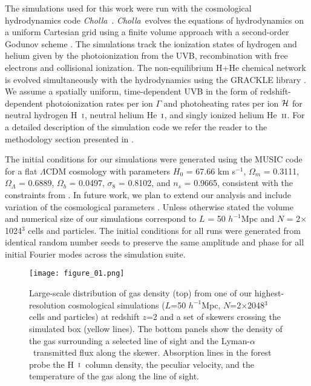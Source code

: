 \documentclass[twocolumn]{aastex62}
\newcommand\Cholla{\emph{Cholla}~}
\newcommand\Lya{Lyman-$\alpha$}
\def\HI{\hbox{\rm H~$\scriptstyle\rm I$}}
\def\HeI{\hbox{He~$\scriptstyle\rm I$}}
\def\HeII{\hbox{He~$\scriptstyle\rm II$}}
\begin{document}
The simulations used for this work were run with the 
cosmological hydrodynamics code \Cholla \citep{schneider2015a, villasenor2021a}. 
\Cholla evolves the equations of hydrodynamics on a uniform Cartesian grid using a finite volume approach with 
a second-order Godunov scheme \citep{Colella+1984}. The simulations track the ionization states of hydrogen and helium 
given by the photoionization 
from the UVB, recombination with free electrons and collisional ionization. The non-equilibrium  H+He chemical network is evolved
simultaneously with the hydrodynamics using the GRACKLE library \citep{smith2017a}. We assume a spatially uniform, time-dependent UVB  
in the form of redshift-dependent photoionization rates per ion $\Gamma$ and photoheating rates per ion $\cal{H}$ for neutral hydrogen \HI, neutral 
helium \HeI,  and singly ionized helium \HeII. For a detailed description of the simulation code we refer the reader to the methodology 
section presented in \cite{villasenor2021a}.   

The initial conditions for our simulations were generated using the MUSIC code \citep{Hahn+2011_Music} for a flat $\Lambda$CDM cosmology with parameters $H_0$ = 67.66 km s$^{-1}$, $\Omega_m$ = 0.3111, $\Omega_{\Lambda}$ = 0.6889, $\Omega_b$ = 0.0497, $\sigma_8$ = 0.8102, 
and $n_s$ = 0.9665, consistent with the constraints from \cite{Planck_collaboration_2020}. In future work, we plan to extend our analysis
and include variation of the cosmological parameters \citep{Bird+2019, Ho+2021}.   
Unless otherwise stated the volume and numerical size of 
our simulations correspond to $L$ = 50 $h^{-1}$Mpc and $N$ = 2$\times$1024$^3$ cells and particles. The initial conditions for all runs were 
generated from identical random number seeds to preserve the same amplitude and phase for all initial Fourier modes across the simulation suite.  


\begin{figure*}
\texttt{[image: figure\_01.png]}
\caption{Large-scale distribution of gas density (top) from one of our highest-resolution cosmological simulations 
($L$=50 $h^{-1}$Mpc, $N$=2$\times$2048$^3$ cells and particles) at redshift $z$=2 and a set of skewers crossing the simulated box (yellow lines). 
The bottom panels show the density of the gas surrounding a selected line of sight and the \Lya\ transmitted flux along the skewer. Absorption lines in the forest probe the \HI\ column density, the peculiar velocity, and the temperature of the gas along the line of sight.}    
\label{fig:density_3D_skewers}
\end{figure*}
\end{document}

